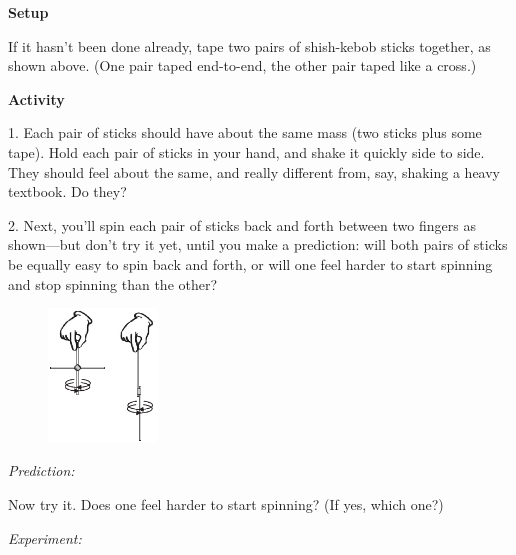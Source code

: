 \bigskip
\textbf{Setup}

If it hasn't been done already, tape two pairs of shish-kebob sticks together, as shown above.  (One pair taped end-to-end, the other pair taped like a cross.)

\bigskip
\textbf{Activity}

1.  Each pair of sticks should have about the same mass (two sticks plus some tape).  Hold each pair of sticks in your hand, and shake it quickly side to side.  They should feel about the same, and really different from, say, shaking a heavy textbook.  Do they?
\answerspace{0.2in}


2.  Next, you'll spin each pair of sticks back and forth between two fingers as shown---but don't try it yet, until you make a prediction: will both pairs of sticks be equally easy to spin back and forth, or will one feel harder to start spinning and stop spinning than the other?

\begin{figure}
    \vspace{-0.40in}
    \includegraphics[width=0.26\textwidth]{moment_inertia_feel/stick_pics2.eps}
\end{figure}

\phantom{indent05}
\textit{Prediction:}
\answerspace{0.2in}

Now try it.  Does one feel harder to start spinning?  (If yes, which one?)

\phantom{indent05}\textit{Experiment:}
\answerspace{0.2in}

